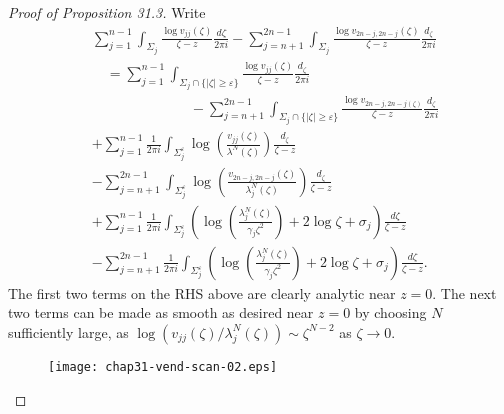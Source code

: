 \documentclass{surv-l}
\theoremstyle{plain}
\theoremstyle{definition}
\numberwithin{equation}{chapter}
\begin{document}
\begin{proof}[Proof of Proposition 31.3]
Write
\begin{align}\label{eq31.22}
&\sum_{j=1}^{n-1}\int_{\Sigma_{j}}\frac{\log v_{jj}(\zeta)}{\zeta-z}\frac{d{\zeta}}{2\pi i}-\sum_{j=n+1}^{2n-1}\int_{\Sigma_{j}}\frac{\log v_{2n-j,2n-j}(\zeta)}{\zeta-z}\frac{d_{\zeta}}{2\pi i}\\ \nonumber
&\quad=\sum_{j=1}^{n-1}\int_{\Sigma_{j}\cap\{|\zeta|\geq\varepsilon\}}\frac{\log v_{jj}(\zeta)}{\zeta-z}\frac{d_{\zeta}}{2\pi i}\\ \nonumber
&\qquad\qquad\qquad\quad-\sum_{j=n+1}^{2n-1}\int_{\Sigma_{j}\cap\{|\zeta|\geq\varepsilon \}}\frac{\log v_{2n-j,2n-j(\zeta)}}{\zeta-z}\frac{d_{\zeta}}{2\pi i}\\ \nonumber
&+\sum_{j=1}^{n-1}\frac{1}{2\pi i}\int_{\Sigma_{j}^{\varepsilon}}\log\left(\frac{v_{jj}(\zeta)}{\lambda^{N}(\zeta)}\right)\frac{d_{\zeta}}{\zeta-z}\\ \nonumber
&-\sum_{j=n+1}^{2n-1}\int_{\Sigma_{j}^{\varepsilon}}\log\left(\frac{v_{2n-j,2n-j}(\zeta)}{\lambda_{j}^{N}(\zeta)}\right)\frac{d_{\zeta}}{\zeta-z}\\ \nonumber
&+\sum_{j=1}^{n-1}\frac{1}{2\pi i}\int_{\Sigma_{j}^{\varepsilon}}\left(\log\left(\frac{\lambda_{j}^{N}(\zeta)}{\gamma_{j}\zeta^{2}}\right)+2\log\zeta+\sigma_{j}\right)\frac{d{\zeta}}{\zeta-z}\\ \nonumber
&-\sum_{j=n+1}^{2n-1}\frac{1}{2\pi i}\int_{\Sigma_{j}^{\varepsilon}}\left(\log\left(\frac{\lambda_{j}^{N}(\zeta)}{\gamma_{j}\zeta^{2}}\right)+2\log\zeta+\sigma_{j}\right)\frac{d{\zeta}}{\zeta-z}.
\end{align}
The first two terms on the RHS above are clearly analytic near $z=0$. The next two terms can be made as smooth as desired near $z=0$ by choosing $N$ sufficiently large, as $\log(v_{jj}(\zeta)/\lambda_{j}^{N}(\zeta))\sim\zeta^{N-2}$ as $\zeta \rightarrow 0$.
\begin{figure}
\texttt{[image: chap31-vend-scan-02.eps]}
\caption{}
\end{figure}



\end{proof}
\end{document}
